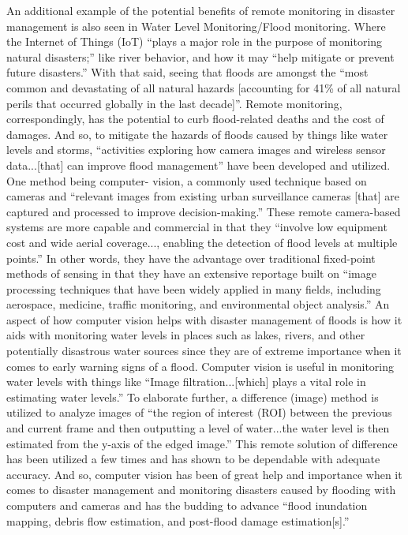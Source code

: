 \documentclass[conference]{IEEEtran}
\begin{document}
An additional example of the potential benefits of remote monitoring in disaster management is also seen 
in Water Level Monitoring/Flood monitoring. Where the Internet of Things (IoT) ``plays a major role in 
the purpose of monitoring natural disasters;'' \cite{b7} like river behavior, and how it may ``help 
mitigate or prevent future disasters.'' \cite{b6} With that said, seeing that floods are amongst the 
``most common and devastating of all natural hazards [accounting for 41\% of all natural perils that occurred 
globally in the last decade]''. \cite{b3} Remote monitoring, correspondingly, has the potential to curb 
flood-related deaths and the cost of damages. And so, to mitigate the hazards of floods caused by things 
like water levels and storms, ``activities exploring how camera images and wireless sensor data...[that] 
can improve flood management''\cite{b3} have been developed and utilized. One method being computer-
vision, a commonly used technique based on cameras and ``relevant images from existing urban surveillance cameras 
[that] are captured and processed to improve decision-making.'' \cite{b3} These remote camera-based 
systems are more capable and commercial in that they ``involve low equipment cost and wide aerial 
coverage..., enabling the detection of flood levels at multiple points.'' \cite{b3} In other words, they 
have the advantage over traditional fixed-point methods of sensing in that they have an extensive 
reportage built on ``image processing techniques that have been widely applied in many fields, including aerospace, 
medicine, traffic monitoring, and environmental object analysis.'' \cite{b3} An aspect of how computer 
vision helps with disaster management of floods is how it aids with monitoring water levels in places such 
as lakes, rivers, and other potentially disastrous water sources since they are of extreme importance when 
it comes to early warning signs of a flood. Computer vision is useful in monitoring water levels with 
things like ``Image filtration...[which] plays a vital role in estimating water levels.'' \cite{b3} To 
elaborate further, a difference (image) method is utilized to analyze images of ``the region of interest 
(ROI) between the previous and current frame and then outputting a level of water...the water level is 
then estimated from the y-axis of the edged image.'' \cite{b3} This remote solution of difference has been 
utilized a few times and has shown to be dependable with adequate accuracy. And so, computer vision has 
been of great help and importance when it comes to disaster management and monitoring disasters caused by 
flooding with computers and cameras and has the budding to advance ``flood inundation mapping, debris flow 
estimation, and post-flood damage estimation[s].'' \cite{b3} \par
\end{document}
